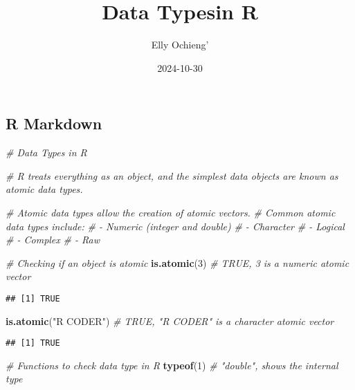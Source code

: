 \documentclass[
]{article}
\title{Data Typesin R}
\author{Elly Ochieng'}
\date{2024-10-30}
\newenvironment{Shaded}{\begin{snugshade}}{\end{snugshade}}
\newcommand{\CommentTok}[1]{\textcolor[rgb]{0.56,0.35,0.01}{\textit{#1}}}
\newcommand{\DecValTok}[1]{\textcolor[rgb]{0.00,0.00,0.81}{#1}}
\newcommand{\FunctionTok}[1]{\textcolor[rgb]{0.13,0.29,0.53}{\textbf{#1}}}
\newcommand{\NormalTok}[1]{#1}
\newcommand{\StringTok}[1]{\textcolor[rgb]{0.31,0.60,0.02}{#1}}
\begin{document}
\maketitle

\subsection{R Markdown}\label{r-markdown}

\begin{Shaded}
\begin{Highlighting}[]
\CommentTok{\# Data Types in R}

\CommentTok{\# R treats everything as an object, and the simplest data objects are known as atomic data types.}

\CommentTok{\# Atomic data types allow the creation of atomic vectors.}
\CommentTok{\# Common atomic data types include:}
\CommentTok{\# {-} Numeric (integer and double)}
\CommentTok{\# {-} Character}
\CommentTok{\# {-} Logical}
\CommentTok{\# {-} Complex}
\CommentTok{\# {-} Raw}

\CommentTok{\# Checking if an object is atomic}
\FunctionTok{is.atomic}\NormalTok{(}\DecValTok{3}\NormalTok{)            }\CommentTok{\# TRUE, 3 is a numeric atomic vector}
\end{Highlighting}
\end{Shaded}

\begin{verbatim}
## [1] TRUE
\end{verbatim}

\begin{Shaded}
\begin{Highlighting}[]
\FunctionTok{is.atomic}\NormalTok{(}\StringTok{"R CODER"}\NormalTok{)    }\CommentTok{\# TRUE, "R CODER" is a character atomic vector}
\end{Highlighting}
\end{Shaded}

\begin{verbatim}
## [1] TRUE
\end{verbatim}

\begin{Shaded}
\begin{Highlighting}[]
\CommentTok{\# Functions to check data type in R}
\FunctionTok{typeof}\NormalTok{(}\DecValTok{1}\NormalTok{)               }\CommentTok{\# "double", shows the internal type}
\end{Highlighting}
\end{Shaded}
\end{document}
